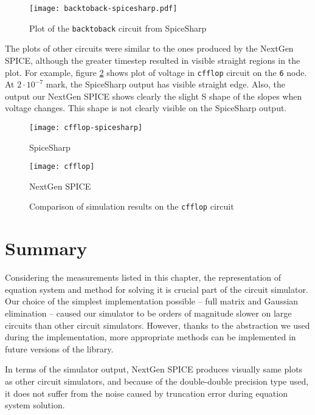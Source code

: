 \begin{figure}[h]
	\centering
	\texttt{[image: backtoback-spicesharp.pdf]}
	\caption{Plot of the \texttt{backtoback} circuit from SpiceSharp}
	\label{fig:backtoback-spicesharp}
\end{figure}

The plots of other circuits were similar to the ones produced by the NextGen SPICE, although the greater timestep resulted in visible straight regions in the plot. For example, figure \ref{fig:cfflop} shows plot of voltage in \texttt{cfflop} circuit on the \texttt{6} node. At $2\cdot 10^{-7}$ mark, the SpiceSharp output has visible straight edge. Also, the output our NextGen SPICE shows clearly the slight S shape of the slopes when voltage changes. This shape is not clearly visible on the SpiceSharp output.

\begin{figure}[h]
	\centering
	\texttt{[image: cfflop-spicesharp]}
	\caption*{SpiceSharp}
	\texttt{[image: cfflop]}
	\caption*{NextGen SPICE}
	\caption{Comparison of simulation results on the \texttt{cfflop} circuit}
	\label{fig:cfflop}
\end{figure}

\section{Summary}

Considering the measurements listed in this chapter, the representation of equation system and method for solving it is crucial part of the circuit simulator. Our choice of the simplest implementation possible -- full matrix and Gaussian elimination -- caused our simulator to be orders of magnitude slower on large circuits than other circuit simulators. However, thanks to the abstraction we used during the implementation, more appropriate methods can be implemented in future versions of the library. 

In terms of the simulator output, NextGen SPICE produces visually same plots as other circuit simulators, and because of the double-double precision type used, it does not suffer from the noise caused by truncation error during equation system solution.